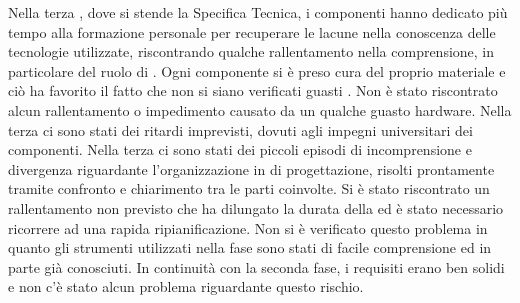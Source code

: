 		Nella terza , dove si stende la Specifica Tecnica, i componenti hanno dedicato più tempo alla formazione personale per recuperare le lacune nella conoscenza delle tecnologie utilizzate, riscontrando qualche rallentamento nella comprensione, in particolare del ruolo di .
		Ogni componente si è preso cura del proprio materiale e ciò ha favorito il fatto che non si siano verificati guasti . Non è stato riscontrato alcun rallentamento o impedimento causato da un qualche guasto hardware.
		Nella terza  ci sono stati dei ritardi imprevisti, dovuti agli impegni universitari dei componenti.
		Nella terza  ci sono stati dei piccoli episodi di incomprensione e divergenza riguardante l’organizzazione in  di progettazione, risolti prontamente tramite confronto e chiarimento tra le parti coinvolte.
		Si è stato riscontrato un rallentamento non previsto che ha dilungato la durata della  ed è stato necessario ricorrere ad una rapida ripianificazione.
		Non si è verificato questo problema in quanto gli strumenti utilizzati nella fase sono stati di facile comprensione ed in parte già conosciuti.
		In continuità con la seconda fase, i requisiti erano ben solidi e non c'è stato alcun problema riguardante questo rischio.

